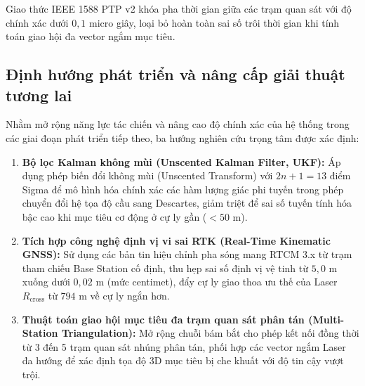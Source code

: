 \begin{table}[H]
\centering
\caption{So sánh độ chính xác đồng bộ thời gian giữa các giao thức mạng phân tán}
\label{tab:time-sync-protocols-comparison-w15}
\end{table}

Giao thức IEEE 1588 PTP v2 khóa pha thời gian giữa các trạm quan sát với độ chính xác dưới $0{,}1$ micro giây, loại bỏ hoàn toàn sai số trôi thời gian khi tính toán giao hội đa vector ngắm mục tiêu.

\subsection{Định hướng phát triển và nâng cấp giải thuật tương lai}

\hspace{0.5cm} Nhằm mở rộng năng lực tác chiến và nâng cao độ chính xác của hệ thống trong các giai đoạn phát triển tiếp theo, ba hướng nghiên cứu trọng tâm được xác định:
\begin{enumerate}
    \item \textbf{Bộ lọc Kalman không mùi (Unscented Kalman Filter, UKF):} Áp dụng phép biến đổi không mùi (Unscented Transform) với $2n+1 = 13$ điểm Sigma để mô hình hóa chính xác các hàm lượng giác phi tuyến trong phép chuyển đổi hệ tọa độ cầu sang Descartes, giảm triệt để sai số tuyến tính hóa bậc cao khi mục tiêu cơ động ở cự ly gần ($< 50$ m).
    \item \textbf{Tích hợp công nghệ định vị vi sai RTK (Real-Time Kinematic GNSS):} Sử dụng các bản tin hiệu chỉnh pha sóng mang RTCM 3.x từ trạm tham chiếu Base Station cố định, thu hẹp sai số định vị vệ tinh từ $5{,}0$ m xuống dưới $0{,}02$ m (mức centimet), đẩy cự ly giao thoa ưu thế của Laser $R_{\text{cross}}$ từ $794$ m về cự ly ngắn hơn.
    \item \textbf{Thuật toán giao hội mục tiêu đa trạm quan sát phân tán (Multi-Station Triangulation):} Mở rộng chuỗi bám bắt cho phép kết nối đồng thời từ 3 đến 5 trạm quan sát nhúng phân tán, phối hợp các vector ngắm Laser đa hướng để xác định tọa độ 3D mục tiêu bị che khuất với độ tin cậy vượt trội.
\end{enumerate}

